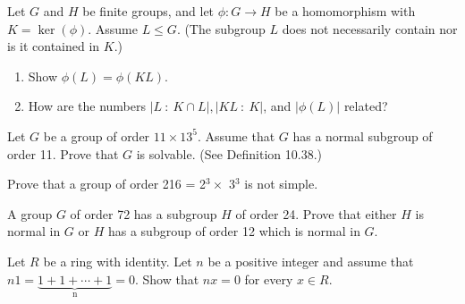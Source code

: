 \documentclass[12pt,letterpaper,boxed]{hmcpset}
\begin{document}


\begin{problem}[11.5.11]
Let $G$ and $H$ be finite groups, and let $\phi: G \rightarrow H$ be a homomorphism with $K = \ker(\phi)$. Assume $L \leq G$. (The subgroup $L$ does not necessarily contain nor is it contained in $K$.)
\begin{enumerate}[label=\alph*]
\item Show $\phi(L) = \phi(KL)$.
\item How are the numbers $\vert L \ : \ K \cap L \vert, \vert KL \ : \ K \vert$, and $\vert \phi(L) \vert$ related?
\end{enumerate}
\end{problem}

\begin{solution}
\end{solution}

\clearpage

\begin{problem}[12.1.4]
Let $G$ be a group of order $11 \times 13^5$. Assume that $G$ has a normal subgroup of order 11. Prove that $G$ is solvable. (See Definition 10.38.)
\end{problem}

\begin{solution}
\end{solution}

\clearpage

\begin{problem}[12.2.2]
Prove that a group of order 216 = 2$^3 \times$ 3$^3$ is not simple.
\end{problem}

\begin{solution}
\end{solution}

\clearpage

\begin{problem}[12.2.4]
A group $G$ of order 72 has a subgroup $H$ of order 24. Prove that either $H$ is normal in $G$ or $H$ has a subgroup of order 12 which is normal in $G$.
\end{problem}

\begin{solution}
\end{solution}

\clearpage

\begin{problem}[15.2.14]
Let $R$ be a ring with identity. Let $n$ be a positive integer and assume that $n1 = \underbrace{1 + 1 + \cdots + 1}_\text{n} = 0$. Show that $nx = 0$ for every $x \in R$.
\end{problem}

\begin{solution}

\end{solution}
\end{document}
